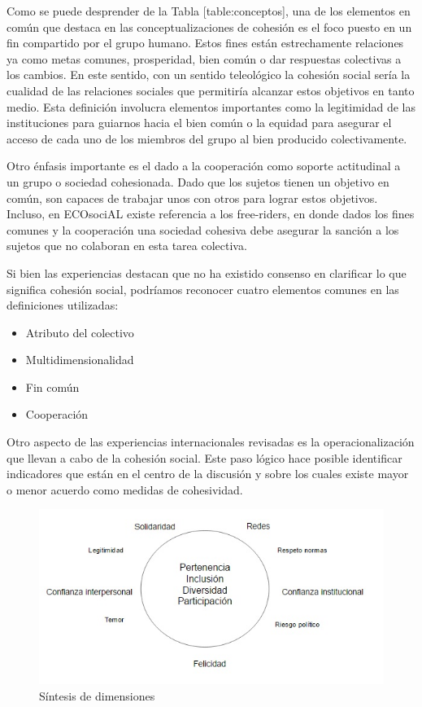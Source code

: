 \documentclass[
  12pt,
]{book}
\providecommand{\tightlist}{%
  \setlength{\itemsep}{0pt}\setlength{\parskip}{0pt}}
\begin{document}
Como se puede desprender de la Tabla {[}table:conceptos{]}, una de los elementos en común que destaca en las conceptualizaciones de cohesión es el foco puesto en un fin compartido por el grupo humano. Estos fines están estrechamente relaciones ya como metas comunes, prosperidad, bien común o dar respuestas colectivas a los cambios. En este sentido, con un sentido teleológico la cohesión social sería la cualidad de las relaciones sociales que permitiría alcanzar estos objetivos en tanto medio. Esta definición involucra elementos importantes como la legitimidad de las instituciones para guiarnos hacia el bien común o la equidad para asegurar el acceso de cada uno de los miembros del grupo al bien producido colectivamente.

Otro énfasis importante es el dado a la cooperación como soporte
actitudinal a un grupo o sociedad cohesionada. Dado que los sujetos
tienen un objetivo en común, son capaces de trabajar unos con otros para
lograr estos objetivos. Incluso, en ECOsociAL existe referencia a los
free-riders, en donde dados los fines comunes y la cooperación una
sociedad cohesiva debe asegurar la sanción a los sujetos que no colaboran en esta tarea colectiva.

Si bien las experiencias destacan que no ha existido consenso en clarificar lo que significa cohesión social, podríamos reconocer cuatro elementos comunes en las definiciones utilizadas:

\begin{itemize}
\tightlist
\item
  Atributo del colectivo
\item
  Multidimensionalidad
\item
  Fin común
\item
  Cooperación
\end{itemize}

Otro aspecto de las experiencias internacionales revisadas es la operacionalización que llevan a cabo de la cohesión social. Este paso lógico hace posible identificar indicadores que están en el centro de la discusión y sobre los cuales existe mayor o menor acuerdo como medidas de cohesividad.

\begin{figure}[H]

{\centering \includegraphics[width=0.75\linewidth]{inputs/images/comun} 

}

\caption{Síntesis de dimensiones}\label{fig:unnamed-chunk-3}
\end{figure}
\end{document}
